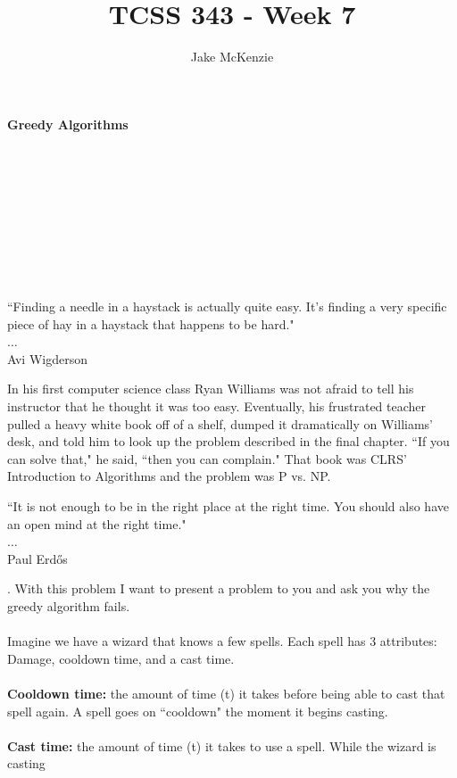 \documentclass[12pt]{article}
\begin{document}
\title{TCSS 343 - Week 7}
\author{Jake McKenzie}
\maketitle
\noindent\centerline{\textbf{Greedy Algorithms}}\\\\\\\\\\\\\\\\
\begin{center}
    ``Finding a needle in a haystack is actually quite easy. It's finding a very specific piece of hay in a haystack that happens to be hard." \\$\dots$\\ Avi Wigderson
\end{center}
\begin{center}
    In his first computer science class Ryan Williams was not afraid to tell his instructor that he thought it was too easy. Eventually, his frustrated teacher pulled a heavy white book off of a shelf, dumped it dramatically on Williams' desk, and told him to look up the problem described in the final chapter. ``If you can solve that," he said, ``then you can complain." That book was CLRS' Introduction to Algorithms and the problem was P vs. NP.
\end{center}
\begin{center}
    ``It is not enough to be in the right place at the right time. You should also have an open mind at the right time." \\$\dots$\\ Paul Erd\H{o}s
\end{center}
\newpage
{}. With this problem I want to present a 
problem to you and ask you why the greedy algorithm fails.\\\\
Imagine we have a wizard that knows a few spells. 
Each spell has 3 attributes: Damage, cooldown time, and a cast time. \\\\
\textbf{Cooldown time:} the amount of time (t) it takes 
before being able to cast that spell again. 
A spell goes on ``cooldown" the moment it begins casting.\\\\
\textbf{Cast time:} the amount of time (t) it takes 
to use a spell. While the wizard is casting 
\end{document}
